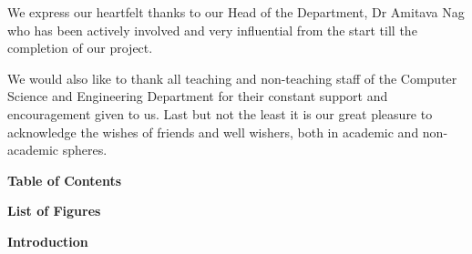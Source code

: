 \documentclass[a4paper]{article}
\begin{document}
	We express our heartfelt thanks to our Head of the Department, Dr Amitava Nag who has been actively involved and very influential from the start till the completion of our project.
	
	We would also like to thank all teaching and non-teaching staff of the Computer Science and Engineering Department for their constant support and encouragement given to us. Last but not the least it is our great pleasure to acknowledge the wishes of friends and well
	wishers, both in academic and non-academic spheres.
	
	\newpage
	\begin{center}
		\textbf{\LARGE Table of Contents}\\[\baselineskip]
	\end{center}
	
	\newpage
	\begin{center}
		\textbf{\LARGE List of Figures}\\[\baselineskip]
	\end{center}
	
	\begin{center}
		\textbf{\LARGE Introduction}\\[\baselineskip]
	\end{center}
\end{document}
